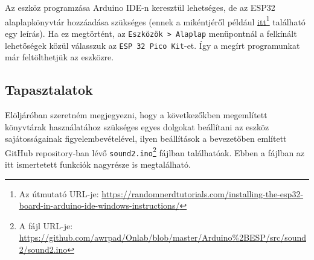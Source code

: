 \documentclass[12pt,a4paper]{article}
\begin{document}
      Az eszköz programzása Arduino IDE-n keresztül lehetséges, de az ESP32 alaplapkönyvtár hozzáadása szükséges (ennek a mikéntjéről például \href{https://randomnerdtutorials.com/installing-the-esp32-board-in-arduino-ide-windows-instructions/}{itt}\footnote{Az útmutató URL-je: \url{https://randomnerdtutorials.com/installing-the-esp32-board-in-arduino-ide-windows-instructions/}} található egy leírás). Ha ez megtörtént, az \texttt{Eszközök > Alaplap} menüpontnál a felkínált lehetőségek közül válasszuk az \texttt{ESP 32 Pico Kit}-et. Így a megírt programunkat már feltölthetjük az eszközre.

    \subsection{Tapasztalatok}
      Elöljáróban szeretném megjegyezni, hogy a következőkben megemlített könyvtárak használatához szükséges egyes dolgokat beállítani az eszköz sajátosságainak figyelembevételével, ilyen beállítások a bevezetőben említett GitHub repository-ban lévő \texttt{sound2.ino}\footnote{A fájl URL-je: \url{https://github.com/awrpad/Onlab/blob/master/Arduino\%2BESP/src/sound2/sound2.ino}} fájlban találhatóak. Ebben a fájlban az itt ismertetett funkciók nagyrésze is megtalálható.
\end{document}
